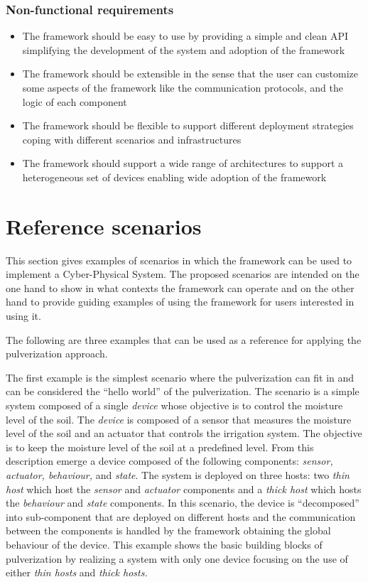 \subsubsection{Non-functional requirements}
\label{sec:non-functional-requirements}

\begin{itemize}
	\item The framework should be easy to use by providing a simple and clean API simplifying the development of the system and adoption of the
	      framework
	\item The framework should be extensible in the sense that the user can customize some aspects of the framework like the communication protocols,
	      and the logic of each component
	\item The framework should be flexible to support different deployment strategies coping with different scenarios and infrastructures
	\item The framework should support a wide range of architectures to support a heterogeneous set of devices enabling wide adoption of the
	      framework
\end{itemize}


\section{Reference scenarios}
\label{sec:reference-scenarios}

This section gives examples of scenarios in which the framework can be used to implement a Cyber-Physical System.
The proposed scenarios are intended on the one hand to show in what contexts the framework can operate and on the other hand to provide guiding
examples of using the framework for users interested in using it.

The following are three examples that can be used as a reference for applying the pulverization approach.

The first example is the simplest scenario where the pulverization can fit in and can be considered the ``hello world'' of the pulverization.
The scenario is a simple system composed of a single \emph{device} whose objective is to control the moisture level of the soil.
The \emph{device} is composed of a sensor that measures the moisture level of the soil and an actuator that controls the irrigation system.
The objective is to keep the moisture level of the soil at a predefined level. From this description emerge a device composed of the following
components: \emph{sensor, actuator, behaviour,} and \emph{state}. The system is deployed on three hosts: two \emph{thin host} which host the
\emph{sensor} and \emph{actuator} components and a \emph{thick host} which hosts the \emph{behaviour} and \emph{state} components.
In this scenario, the device is ``decomposed'' into sub-component that are deployed on different hosts and the communication between the
components is handled by the framework obtaining the global behaviour of the device. This example shows the basic building blocks of pulverization
by realizing a system with only one device focusing on the use of either \emph{thin hosts} and \emph{thick hosts.}

